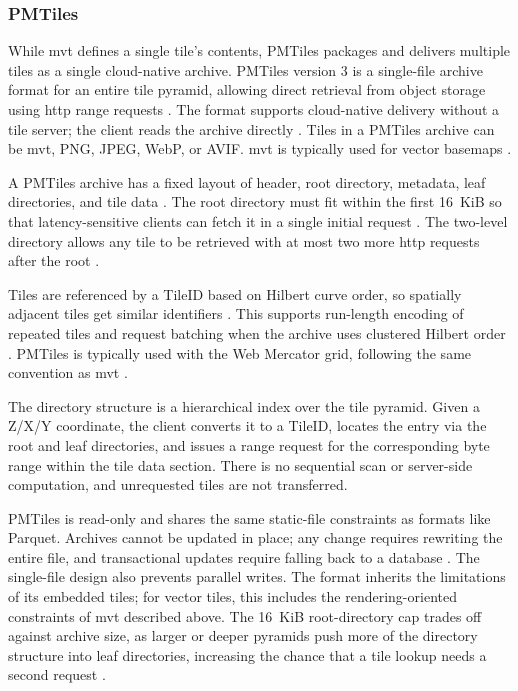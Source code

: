 \subsubsection{PMTiles}
While \acrshort{mvt} defines a single tile's contents, PMTiles packages and delivers multiple tiles as a single cloud-native archive. PMTiles version 3 is a single-file archive format for an entire tile pyramid, allowing direct retrieval from object storage using \acrshort{http} range requests \parencite{protomaps2024_pmtiles_specification_v3, cngfoundation2024_pmtiles_guide}. The format supports cloud-native delivery without a tile server; the client reads the archive directly \parencite{cngfoundation2024_pmtiles_guide}. Tiles in a PMTiles archive can be \acrshort{mvt}, PNG, JPEG, WebP, or AVIF. \acrshort{mvt} is typically used for vector basemaps \parencite{protomaps2024_pmtiles_specification_v3}.

A PMTiles archive has a fixed layout of header, root directory, metadata, leaf directories, and tile data \parencite{protomaps2024_pmtiles_specification_v3}. The root directory must fit within the first 16~KiB so that latency-sensitive clients can fetch it in a single initial request \parencite{protomaps2024_pmtiles_specification_v3}. The two-level directory allows any tile to be retrieved with at most two more \acrshort{http} requests after the root \parencite{protomaps2023_pmtiles_v3_whats_new}.

Tiles are referenced by a TileID based on Hilbert curve order, so spatially adjacent tiles get similar identifiers \parencite{protomaps2024_pmtiles_specification_v3, cngfoundation2024_pmtiles_guide}. This supports run-length encoding of repeated tiles and request batching when the archive uses clustered Hilbert order \parencite{protomaps2024_pmtiles_specification_v3, protomaps2023_pmtiles_v3_whats_new}. PMTiles is typically used with the Web Mercator grid, following the same convention as \acrshort{mvt} \parencite{cngfoundation2024_pmtiles_guide}.

The directory structure is a hierarchical index over the tile pyramid. Given a Z/X/Y coordinate, the client converts it to a TileID, locates the entry via the root and leaf directories, and issues a range request for the corresponding byte range within the tile data section. There is no sequential scan or server-side computation, and unrequested tiles are not transferred.

PMTiles is read-only and shares the same static-file constraints as formats like Parquet. Archives cannot be updated in place; any change requires rewriting the entire file, and transactional updates require falling back to a database \parencite{protomaps2024_pmtiles_concepts}. The single-file design also prevents parallel writes. The format inherits the limitations of its embedded tiles; for vector tiles, this includes the rendering-oriented constraints of \acrshort{mvt} described above. The 16~KiB root-directory cap trades off against archive size, as larger or deeper pyramids push more of the directory structure into leaf directories, increasing the chance that a tile lookup needs a second request \parencite{protomaps2024_pmtiles_specification_v3, protomaps2023_pmtiles_v3_whats_new}.

